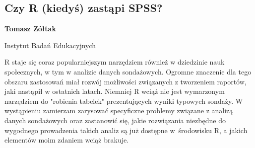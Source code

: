 \documentclass[\main/boa.tex]{subfiles}
\begin{document}
\subsection{Czy R (kiedyś) zastąpi SPSS?}

\begin{minipage}{0.915\textwidth}
	\centering
  {\bf {}  Tomasz Zółtak}
\end{minipage}



\begin{affiliations}
\begin{minipage}{0.915\textwidth}
\centering
Instytut Badań Edukacyjnych \\[-2pt]
\end{minipage}
\end{affiliations}

\vskip 0.3cm

 R staje się coraz popularniejszym narzędziem również w dziedzinie nauk społecznych, w tym w analizie danych sondażowych. Ogromne znaczenie dla tego obszaru zastosowań miał rozwój możliwości związanych z tworzeniem raportów, jaki nastąpił w ostatnich latach. Niemniej R wciąż nie jest wymarzonym narzędziem do "robienia tabelek" prezentujących wyniki typowych sondaży. W wystąpieniu zamierzam zarysować specyficzne problemy związane z analizą danych sondażowych oraz zastanowić się, jakie rozwiązania niezbędne do wygodnego prowadzenia takich analiz są już dostępne w~środowisku R, a jakich elementów moim zdaniem wciąż brakuje. 
\end{document}
